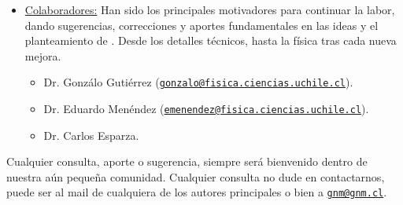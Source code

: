 \begin{itemize}
\item \underline{\sc Colaboradores:} Han sido los principales motivadores para continuar la labor, dando sugerencias, correcciones y aportes fundamentales en las ideas y el planteamiento de {\lpmd}. Desde los detalles t\'ecnicos, hasta la f\'isica tras cada nueva mejora.

\begin{itemize}
 \item Dr. Gonz\'alo Guti\'errez (\href{http://fisica.ciencias.uchile.cl/~gonzalo/}{\tt gonzalo@fisica.ciencias.uchile.cl}).
 \item Dr. Eduardo Men\'endez (\href{http://fisica.ciencias.uchile.cl/~emenendez/}{\tt emenendez@fisica.ciencias.uchile.cl}).
 \item Dr. Carlos Esparza.
\end{itemize}
\end{itemize}

Cualquier consulta, aporte o sugerencia, siempre ser\'a bienvenido dentro de nuestra a\'un peque\~na comunidad. Cualquier consulta no dude en contactarnos, puede ser al mail de cualquiera de los autores principales o bien a \href{http://www.gnm.cl/}{\tt gnm@gnm.cl}.
